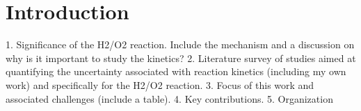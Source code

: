 \section{Introduction}
\label{sec:intro}


1. Significance of the H2/O2 reaction. Include the mechanism and a discussion on why
   is it important to study the kinetics? 
2. Literature survey of studies aimed at quantifying the uncertainty associated with
reaction kinetics (including my own work) and specifically for the H2/O2 reaction.
3. Focus of this work and associated challenges (include a table).
4. Key contributions.
5. Organization

